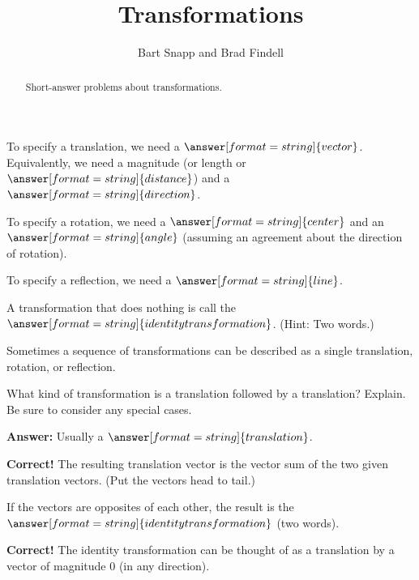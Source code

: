 \documentclass[nooutcomes]{ximera}
\title{Transformations}
\author{Bart Snapp and Brad Findell}
\begin{document}
\begin{abstract}
Short-answer problems about transformations. 
\end{abstract}
\maketitle


\begin{question}
To specify a translation, we need a $\answer[format=string]{vector}$.  Equivalently, we need a magnitude (or length or $\answer[format=string]{distance}$) and a $\answer[format=string]{direction}$.  
\end{question}

\begin{question}
To specify a rotation, we need a $\answer[format=string]{center}$ and an $\answer[format=string]{angle}$ (assuming an agreement about the direction of rotation).  
\end{question}

\begin{question}
To specify a reflection, we need a $\answer[format=string]{line}$.  
\end{question}

\begin{question}
A transformation that does nothing is call the $\answer[format=string]{identity transformation}$.  (Hint: Two words.)
\end{question}

Sometimes a sequence of transformations can be described as a single translation, rotation, or reflection.  

\begin{question}
What kind of transformation is a translation followed by a translation?  Explain.  Be sure to consider any special cases.  

\textbf{Answer:} Usually a $\answer[format=string]{translation}$.  
\begin{feedback}[correct]
\textbf{Correct!} The resulting translation vector is the vector sum of the two given translation vectors.  (Put the vectors head to tail.)
\end{feedback}
\begin{question}
If the vectors are opposites of each other, the result 
is the $\answer[format=string]{identity transformation}$ (two words).  
\begin{feedback}[correct]
\textbf{Correct!} The identity transformation can be thought of as a translation by a vector of magnitude $0$ (in any direction).
\end{feedback}
\end{question}
\end{question}
\end{document}
